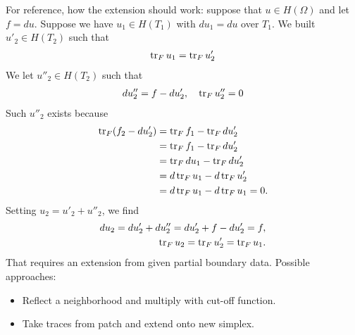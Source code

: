 \documentclass[a4paper]{article}
\begin{document}
\begin{remark}
    For reference, how the extension should work:
    suppose that $u \in H(\Omega)$ and let $f = du$.
    Suppose we have $u_1 \in H(T_1)$ with $du_1 = du$ over $T_1$. 
    We built $u'_2 \in H(T_2)$ such that 
    \begin{align*}
        \operatorname{tr}_F u_1 = \operatorname{tr}_F u'_2
    \end{align*}
    We let $u''_2 \in H(T_2)$ such that 
    \begin{align*}
        d u''_2 = f - d u'_2, \quad \operatorname{tr}_F u''_2 = 0
    \end{align*}
    Such $u''_2$ exists because 
    \begin{align*}
        \operatorname{tr}_F( f_2 - d u'_2 ) 
        &= 
        \operatorname{tr}_F f_1 - \operatorname{tr}_F d u'_2
        \\&= 
        \operatorname{tr}_F f_1 - \operatorname{tr}_F d u'_2
        \\&= 
        \operatorname{tr}_F d u_1 - \operatorname{tr}_F d u'_2
        \\&= 
        d \operatorname{tr}_F u_1 - d \operatorname{tr}_F u'_2
        \\&= 
        d \operatorname{tr}_F u_1 - d \operatorname{tr}_F u_1
        = 0
        .
    \end{align*}
    Setting $u_2 = u'_2 + u''_2$, we find 
    \begin{align*}
        d u_2 = d u'_2 + d u''_2 = d u'_2 + f - d u'_2 = f,
        \\
        \operatorname{tr}_F u_2 = \operatorname{tr}_F u'_2 = \operatorname{tr}_F u_1.
    \end{align*}
    That requires an extension from given partial boundary data. 
    Possible approaches:
    \begin{itemize}
        \item Reflect a neighborhood and multiply with cut-off function.
        \item Take traces from patch and extend onto new simplex. 
    \end{itemize}
\end{remark}
\end{document}
